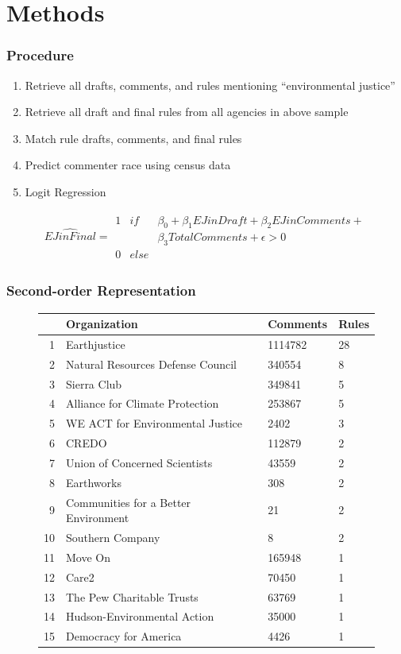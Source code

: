 \documentclass[10pt]{beamer}
\begin{document}
\section{Methods}

\begin{frame}
\frametitle{Procedure}
\begin{enumerate}
\item Retrieve all drafts, comments, and rules mentioning ``environmental justice''
\item Retrieve all draft and final rules from all agencies in above sample
\item Match rule drafts, comments, and final rules
\item Predict commenter race using census data
\item Logit Regression
\end{enumerate}
\begin{align*}
  \hat{EJ in Final} =
  \begin{array}{lll}
    1 & if &  \beta_0 + \beta_1 EJ in Draft + \beta_2 EJ in Comments + \\ & & \beta_3 Total Comments  + \epsilon > 0\\
0 & else &  
  \end{array}
\end{align*}

\end{frame}

\begin{frame}
\frametitle{Second-order Representation}
\begin{figure}[!h]
\centering
\begin{tabular}{rlll}
  \hline
 & Organization & Comments & Rules \\ 
  \hline
1 & Earthjustice & 1114782 & 28 \\ 
  2 & Natural Resources Defense Council &  340554 &  8 \\ 
  3 & Sierra Club &  349841 &  5 \\ 
  4 & Alliance for Climate Protection &  253867 &  5 \\ 
  5 & WE ACT for Environmental Justice &    2402 &  3 \\ 
  6 & CREDO &  112879 &  2 \\ 
  7 & Union of Concerned Scientists &   43559 &  2 \\ 
  8 & Earthworks &     308 &  2 \\ 
  9 & Communities for a Better Environment &      21 &  2 \\ 
  10 & Southern Company &       8 &  2 \\ 
  11 & Move On &  165948 &  1 \\ 
  12 & Care2 &   70450 &  1 \\ 
  13 & The Pew Charitable Trusts &   63769 &  1 \\ 
  14 & Hudson-Environmental Action &   35000 &  1 \\ 
  15 & Democracy for America &    4426 &  1 \\ 
  \end{tabular}
  \label{fig:orgs}
  \end{figure}

\end{frame}
\end{document}

